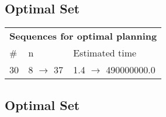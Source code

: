 \documentclass{article}
\begin{document}
                            \subsection*{Optimal Set}

                            \begin{center}
                            \begin{tabular}{@{}l|l|l@{}}
                            \multicolumn{3}{c}{\bf \large Sequences for optimal planning}\\
                            \# & n & Estimated time\\\midrule
                            30&8 $\rightarrow$ 37&1.4 $\rightarrow$ 490000000.0
                            \end{tabular}
                            \end{center}
                    
                                \subsection*{Optimal Set}
                                
\end{document}
